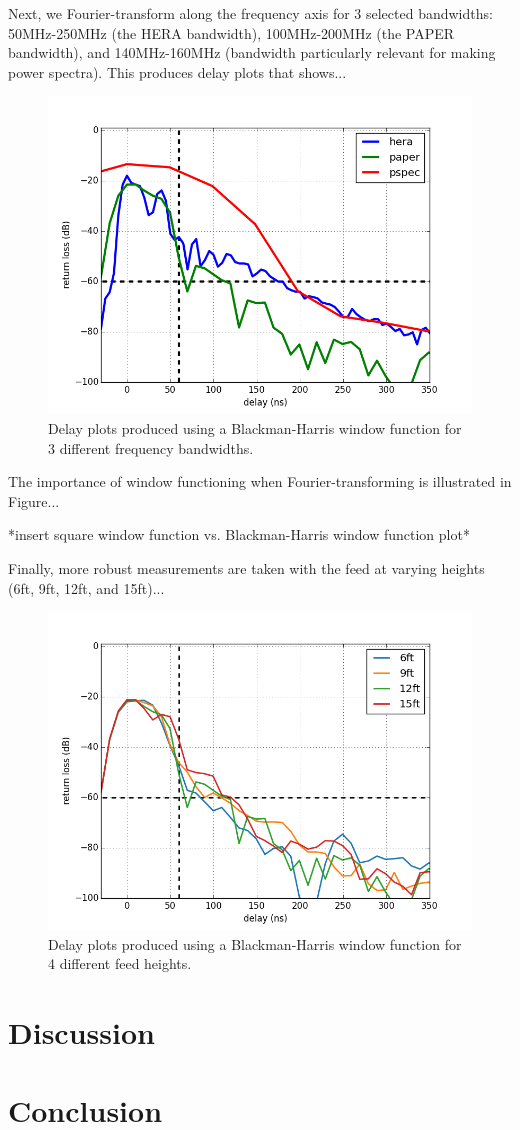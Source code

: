\documentclass[12pt,preprint]{aastex}
\begin{document}
Next, we Fourier-transform along the frequency axis for 3 selected bandwidths: 50MHz-250MHz (the HERA bandwidth), 100MHz-200MHz (the PAPER bandwidth), and 140MHz-160MHz (bandwidth particularly relevant for making power spectra). This produces delay plots that shows...

\begin{figure}[H]
\centering
\includegraphics[totalheight=0.5\textheight]{plots/delay3_window.png}
\caption{Delay plots produced using a Blackman-Harris window function for 3 different frequency bandwidths.}
\end{figure}

The importance of window functioning when Fourier-transforming is illustrated in Figure...

*insert square window function vs. Blackman-Harris window function plot*

Finally, more robust measurements are taken with the feed at varying heights (6ft, 9ft, 12ft, and 15ft)...

\begin{figure}[H]
\centering
\includegraphics[totalheight=0.5\textheight]{plots/delay_heights.png}
\caption{Delay plots produced using a Blackman-Harris window function for 4 different feed heights.}
\end{figure}


\section{Discussion}

\section{Conclusion}
\end{document}
